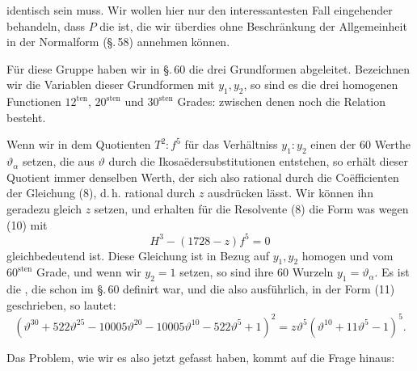  identisch sein muss. Wir wollen hier nur den interessantesten Fall eingehender behandeln, dass $P$ die  ist, die wir überdies ohne Beschränkung der Allgemeinheit in der Normalform (\S.\,58) annehmen können.

Für diese Gruppe haben wir in \S.\,60 die drei Grundformen abgeleitet. Bezeichnen wir die Variablen dieser Grundformen mit $y_1, y_2$, so sind es die drei homogenen Functionen $12^{\mathrm{ten}}$, $20^{\mathrm{sten}}$ und $30^{\mathrm{sten}}$ Grades:
zwischen denen noch die Relation
besteht.

Wenn wir in dem Quotienten $T^2 : f^5$ für das Verhältniss $y_1 : y_2$ einen der 60 Werthe $\vartheta_\alpha$ setzen, die aus $\vartheta$ durch die Ikosaëdersubstitutionen entstehen, so erhält dieser Quotient immer denselben Werth, der sich also rational durch die Coëfficienten der Gleichung (8), d.\,h. rational durch $z$ ausdrücken lässt. Wir können ihn geradezu gleich $z$ setzen, und erhalten für die Resolvente (8) die Form
was wegen (10) mit
\[
H^3 - (1728 - z) f^5 = 0
\]
gleichbedeutend ist. Diese Gleichung ist in Bezug auf $y_1, y_2$ homogen und vom $60^{\mathrm{sten}}$ Grade, und wenn wir $y_2 = 1$ setzen, so sind ihre 60 Wurzeln $y_1 = \vartheta_\alpha$. Es ist die , die schon im \S.\,60 definirt war, und die also ausführlich, in der Form (11) geschrieben, so lautet:
\[
(\vartheta^{30} + 522 \vartheta^{25} - 10005 \vartheta^{20} - 10005 \vartheta^{10} - 522 \vartheta^5 + 1)^2 = z \vartheta^5 (\vartheta^{10} + 11 \vartheta^5 - 1)^5.
\]

Das Problem, wie wir es also jetzt gefasst haben, kommt auf die Frage hinaus:

